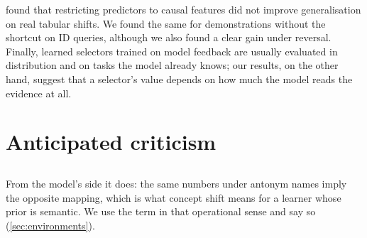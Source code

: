 \citet{nastl2024causal} found that restricting predictors to causal features did not improve generalisation on real tabular shifts. We found the same for demonstrations without the shortcut on ID queries, although we also found a clear gain under reversal. Finally, learned selectors trained on model feedback \citep{rubin2022learning, ye2023compositional} are usually evaluated in distribution and on tasks the model already knows; our results, on the other hand, suggest that a selector's value depends on how much the model reads the evidence at all.

\section{Anticipated criticism}
\label{sec:criticism}

\subsection*{}



{From the model's side it does: the same numbers under antonym names imply the opposite mapping, which is what concept shift means for a learner whose prior is semantic. We use the term in that operational sense and say so (\autoref{sec:environments}).}


\subsection*{}


